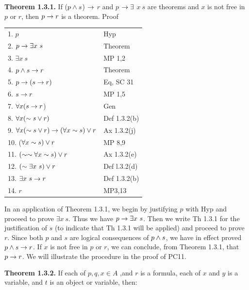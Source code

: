 \begin{large}
\textbf{Theorem 1.3.1.} If ($p \wedge s$) $\to$ $r$ and $p$ $\to \exists$ $x ~s$ are theorems and $x$ is not free in $p$ or $r$, then $p \to r$ is a theorem. \nl
Proof \nl
\begin{tabular}{ l l}
1. $p$ & Hyp \\
2. $p \to \exists  x~ s$ & Theorem \\
3. $\exists x~ s$ & MP 1,2 \\
4. $p \wedge s \to r$ & Theorem \\
5. $p \to(s \to r )$ & Eq, SC 31 \\
6. $s\to r$ & MP 1,5 \\
7. $\forall x (s \to r$) & Gen \\
8. $\forall x(\sim s\lor r)$ & Def 1.3.2(b) \\
9. $\forall x( \sim  s\lor r) \to ( \forall x \sim s) \lor r$ & Ax 1.3.2(j) \\
10. ($\forall x \sim s) \lor r$ & MP 8,9  \\
11. $(\sim  \sim  \forall x \sim s) \lor r$ & Ax 1.3.2(e) \\
12. $(\sim \exists x~ s) \lor r$ & Def l.3.2(d) \\
13. $\exists x~ s \to r$ & Def 1.3.2(b) \\
14. $r$ & MP3,13 \\
\end{tabular}\nl

In an application of Theorem 1.3.1, we begin by justifying $p$ with Hyp and proceed to prove $\exists x~ s$. Thus we have $p\to \exists x~ s$. Then we write Th 1.3.1 for the justification of $s$ (to indicate that Th 1.3.1 will be applied) and proceed to prove $r$. Since both $p$ and $s$ are logical consequences of $p \wedge s$, we have in effect proved $p \wedge s \to r$. If $x$ is not free in $p$ or $r$, we can conclude, from Theorem 1.3.1, that $p \to r$. We will illustrate the procedure in the proof of PC11. \nl

\textbf{Theorem 1.3.2.} If each of $p, q, x \in A$  ,and $r$ is a formula, each of $x$ and $y$ is a variable, and $t$ is an object or variable, then: \nl



\end{large}
